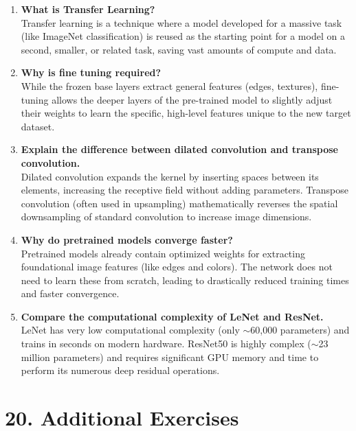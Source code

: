 \documentclass[11pt]{article}
\begin{document}
\begin{enumerate}
\item \textbf{What is Transfer Learning?}\\
Transfer learning is a technique where a model developed for a massive task (like ImageNet classification) is reused as the starting point for a model on a second, smaller, or related task, saving vast amounts of compute and data.

\item \textbf{Why is fine tuning required?}\\
While the frozen base layers extract general features (edges, textures), fine-tuning allows the deeper layers of the pre-trained model to slightly adjust their weights to learn the specific, high-level features unique to the new target dataset.

\item \textbf{Explain the difference between dilated convolution and transpose convolution.}\\
Dilated convolution expands the kernel by inserting spaces between its elements, increasing the receptive field without adding parameters. Transpose convolution (often used in upsampling) mathematically reverses the spatial downsampling of standard convolution to increase image dimensions.

\item \textbf{Why do pretrained models converge faster?}\\
Pretrained models already contain optimized weights for extracting foundational image features (like edges and colors). The network does not need to learn these from scratch, leading to drastically reduced training times and faster convergence.

\item \textbf{Compare the computational complexity of LeNet and ResNet.}\\
LeNet has very low computational complexity (only $\sim$60,000 parameters) and trains in seconds on modern hardware. ResNet50 is highly complex ($\sim$23 million parameters) and requires significant GPU memory and time to perform its numerous deep residual operations.

\end{enumerate}


\section*{20. Additional Exercises}
\end{document}
